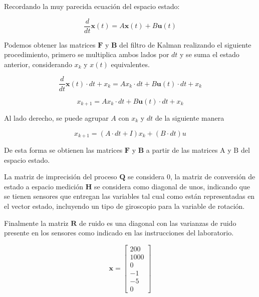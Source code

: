 \documentclass[titlepage, letterpaper]{article}
\begin{document}
Recordando la muy parecida ecuación del espacio estado:

\begin{equation*}
	\frac{d}{d t} \pmb{x}{\left(t \right)}
	= A\pmb{x}(t) + B \pmb{u}(t)
\end{equation*}

Podemos obtener las matrices $\pmb{F}$ y $\pmb{B}$ del filtro de Kalman realizando el siguiente procedimiento, primero se multiplica ambos lados por $dt$ y se suma el estado anterior, considerando $x_k$ y $x(t)$ equivalentes.

\begin{equation*}
	\frac{d}{d t} \pmb{x}{\left(t \right)} \cdot dt + x_k
	= A x_k \cdot dt + B \pmb{u}(t) \cdot dt + x_k
\end{equation*}

\begin{equation*}
	x_{k+1}
	= A x_k \cdot dt + B \pmb{u}(t) \cdot dt + x_k
\end{equation*}

Al lado derecho, se puede agrupar $A$ con $x_k$ y $dt$ de la siguiente manera

\begin{equation*}
	x_{k+1}
	= (A \cdot dt + I) x_k + (B \cdot dt) u
\end{equation*}

De esta forma se obtienen las matrices $\pmb{F}$ y $\pmb{B}$ a partir de las matrices A y B del espacio estado.

La matriz de imprecisión del proceso $\pmb{Q}$ se considera 0, la matriz de conversión de estado a espacio medición $\pmb{H}$ se considera como diagonal de unos, indicando que se tienen sensores que entregan las variables tal cual como están representadas en el vector estado, incluyendo un tipo de giroscopio para la variable de rotación.

Finalmente la matriz $\pmb{R}$ de ruido es una diagonal con las varianzas de ruido presente en los sensores como indicado en las instrucciones del laboratorio.

\begin{equation*}\pmb{x} = \left[\begin{matrix}200\\1000\\0\\-1\\-5\\0\end{matrix}\right]\end{equation*}
\end{document}
